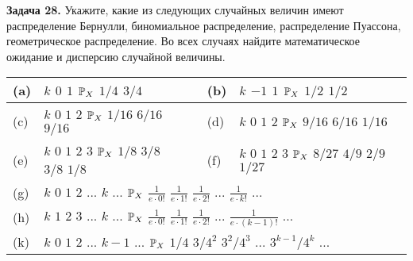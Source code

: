\textbf{Задача 28.} Укажите, какие из следующих случайных величин имеют распределение Бернулли, биномиальное распределение, распределение Пуассона, геометрическое распределение. Во всех случаях найдите математическое ожидание и дисперсию случайной величины.

\begin{tabular}{|p{0.2in}|p{1.6in}|p{0.5in}|p{0.3in}|p{1.7in}|p{0.1in}|} \hline 
(a) & $k$ $0$ $1$ \newline ${\rm {\mathbb P}}_{X} $ $1/4$ $3/4$ \newline   &  & (b) & $k$ $-1$ $1$ \newline ${\rm {\mathbb P}}_{X} $ $1/2$ $1/2$ \newline  \\ \hline 
(c) & $k$ $0$ $1$ $2$ \newline ${\rm {\mathbb P}}_{X} $ $1/16$ $6/16$ $9/16$ \newline   &  & (d) & $k$ $0$ $1$ $2$ \newline ${\rm {\mathbb P}}_{X} $ $9/16$ $6/16$ $1/16$ \newline  \\ \hline 
(e) & $k$ $0$ $1$ $2$ $3$ \newline ${\rm {\mathbb P}}_{X} $ $1/8$ $3/8$ $3/8$ $1/8$ \newline  &  & (f) & $k$ $0$ $1$ $2$ $3$ \newline ${\rm {\mathbb P}}_{X} $ $8/27$ $4/9$ $2/9$ $1/27$ \newline   \\ \hline 
(g) & \multicolumn{5}{|p{4.2in}|}{$k$ $0$ $1$ $2$ $...$ $k$ $...$ \newline ${\rm {\mathbb P}}_{X} $ ${\tfrac{1}{e\cdot 0!}} $ ${\tfrac{1}{e\cdot 1!}} $ ${\tfrac{1}{e\cdot 2!}} $ $...$ ${\tfrac{1}{e\cdot k!}} $ $...$ \newline   } \\ \hline 
(h) & \multicolumn{5}{|p{4.2in}|}{$k$ $1$ $2$ $3$ $...$ $k$ $...$ \newline ${\rm {\mathbb P}}_{X} $ ${\tfrac{1}{e\cdot 0!}} $ ${\tfrac{1}{e\cdot 1!}} $ ${\tfrac{1}{e\cdot 2!}} $ $...$ ${\tfrac{1}{e\cdot (k-1)!}} $ $...$ \newline  } \\ \hline 
(k) & \multicolumn{5}{|p{4.2in}|}{$k$ $0$ $1$ $2$ $...$ $k-1$ $...$ \newline ${\rm {\mathbb P}}_{X} $ $1/4$ $3/4^{2} $ $3^{2} /4^{3} $ $...$ $3^{k-1} /4^{k} $ $...$ \newline } \\ \hline 
\end{tabular}





